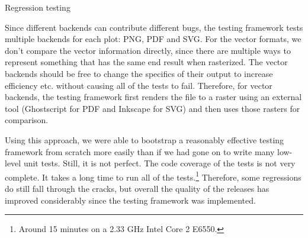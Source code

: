 \begin{aosasect1}{Regression testing}

Since different backends can contribute different bugs, the testing
framework tests multiple backends for each plot: PNG, PDF and SVG.
For the vector formats, we don't compare the vector information
directly, since there are multiple ways to represent something that
has the same end result when rasterized.  The vector backends should
be free to change the specifics of their output to increase efficiency
etc. without causing all of the tests to fail.  Therefore, for vector
backends, the testing framework first renders the file to a raster
using an external tool (Ghostscript for PDF and Inkscape for SVG) and
then uses those rasters for comparison.

Using this approach, we were able to bootstrap a reasonably effective
testing framework from scratch more easily than if we had gone on to
write many low-level unit tests.  Still, it is not perfect.  The code
coverage of the tests is not very complete.  It takes a long time to
run all of the tests.\footnote{Around 15 minutes on a 2.33 GHz Intel
  Core 2 E6550.}  Therefore, some regressions do still fall through
the cracks, but overall the quality of the releases has improved
considerably since the testing framework was implemented.

\end{aosasect1}

